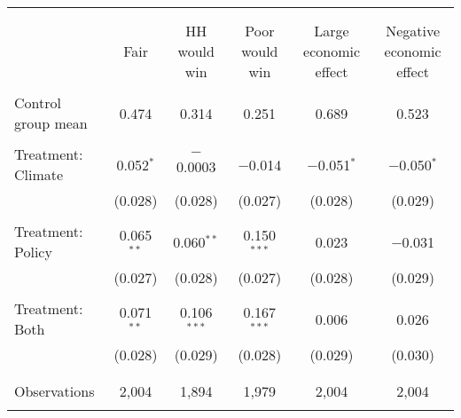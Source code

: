 
\begin{tabular}{@{\extracolsep{5pt}}lccccc} 
\\[-1.8ex]\hline 
\hline \\[-1.8ex] 
\\[-1.8ex] & Fair & HH would win & Poor would win & Large economic effect & Negative economic effect \\ 
\hline \\[-1.8ex] 
 Control group mean & 0.474 & 0.314 & 0.251 & 0.689 & 0.523  \\ \hline \\[-1.8ex] Treatment: Climate & 0.052$^{*}$ & $-$0.0003 & $-$0.014 & $-$0.051$^{*}$ & $-$0.050$^{*}$ \\ 
  & (0.028) & (0.028) & (0.027) & (0.028) & (0.029) \\ 
  & & & & & \\ 
 Treatment: Policy & 0.065$^{**}$ & 0.060$^{**}$ & 0.150$^{***}$ & 0.023 & $-$0.031 \\ 
  & (0.027) & (0.028) & (0.027) & (0.028) & (0.029) \\ 
  & & & & & \\ 
 Treatment: Both & 0.071$^{**}$ & 0.106$^{***}$ & 0.167$^{***}$ & 0.006 & 0.026 \\ 
  & (0.028) & (0.029) & (0.028) & (0.029) & (0.030) \\ 
  & & & & & \\ 
\hline \\[-1.8ex] 

Observations & 2,004 & 1,894 & 1,979 & 2,004 & 2,004 \\ 
\hline 
\hline \\[-1.8ex] 
\end{tabular} 